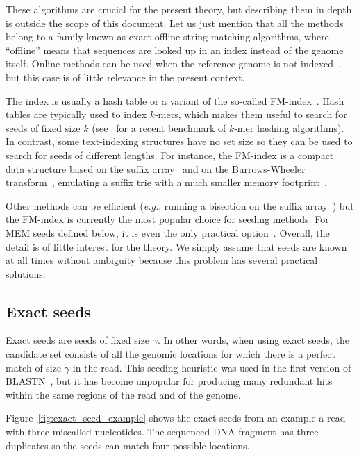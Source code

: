 \documentclass{article}
\begin{document}
These algorithms are crucial for the present theory, but describing them
in depth is outside the scope of this document. Let us just mention that
all the methods belong to a family known as exact offline string matching
algorithms, where ``offline'' means that sequences are looked up in an
index instead of the genome itself. Online methods can be used when the
reference genome is not indexed~\cite{faro2013exact}, but this case is of
little relevance in the present context.

The index is usually a hash table or a variant of the so-called
FM-index~\cite{ferragina2000opportunistic, ferragina2005indexing}. Hash
tables are typically used to index $k$-mers, which makes them useful to
search for seeds of fixed size $k$ (see~\cite{pmid30346548} for a recent
benchmark of $k$-mer hashing algorithms). In contrast, some text-indexing
structures have no set size so they can be used to search for seeds of
different lengths. For instance, the FM-index is a compact data structure
based on the suffix array~\cite{manber1993suffix} and on the
Burrows-Wheeler transform~\cite{burrows1994block}, emulating a suffix trie
with a much smaller memory footprint~\cite{ferragina2000opportunistic,
ferragina2005indexing}.

Other methods can be efficient (\textit{e.g.}, running a bisection on the
suffix array~\cite{dobin2013star}) but the FM-index is currently the most
popular choice for seeding methods. For MEM seeds defined below, it is
even the only practical option~\cite{pmid24336412, pmid25399029,
pmid23349213, pmid19389736}. Overall, the detail is of little interest for
the theory. We simply assume that seeds are known at all times without
ambiguity because this problem has several practical solutions.


\subsection{Exact seeds}

Exact seeds are seeds of fixed size $\gamma$. In other words, when using
exact seeds, the candidate set consists of all the genomic locations for
which there is a perfect match of size $\gamma$ in the read. This seeding
heuristic was used in the first version of BLASTN~\cite{pmid2231712}, but
it has become unpopular for producing many redundant hits within the same
regions of the read and of the genome.

Figure~\ref{fig:exact_seed_example} shows the exact seeds from an example
a read with three miscalled nucleotides. The sequenced DNA fragment has
three duplicates so the seeds can match four possible locations.
\end{document}
